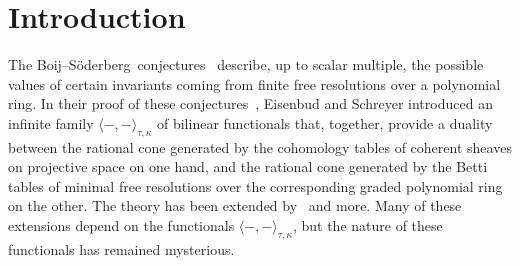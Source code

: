 \documentclass[12pt]{amsart}
\theoremstyle{definition}
\theoremstyle{remark}
\def\BS{Boij--S\"oderberg~}
\begin{document}
\section*{Introduction}
%
%
%


The \BS conjectures~\cite{boij-sod1}
describe, up to scalar multiple, the possible values of certain invariants coming from finite free resolutions over a polynomial ring.  
In their proof of these conjectures~\cite{eis-schrey1}, Eisenbud and Schreyer introduced an infinite family $\langle -,-\rangle_{\tau,\kappa}$ of bilinear functionals that, together, provide a duality between the rational cone generated by the cohomology tables of coherent sheaves on projective space on one hand,  and the rational cone generated by the Betti tables of minimal free resolutions over the corresponding graded polynomial ring on the other. 
The theory has been extended by~\cites{bbeg, beks-local,beks-tensor,boij-floystad, boij-sod2,
eis-schrey2, 
erman-semigroup,
floystad-multigraded, sam-weyman} and more.  
Many of these extensions depend on the functionals  $\langle -,-\rangle_{\tau,\kappa}$,
but the nature of these functionals has remained mysterious.  
\end{document}
